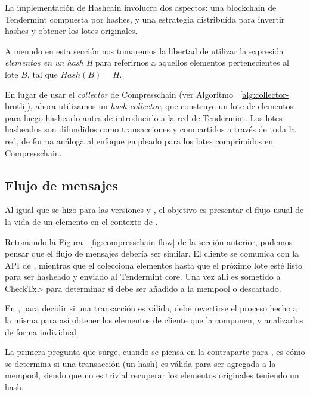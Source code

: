 La implementación de Hashcain involucra dos aspectos: una blockchain de Tendermint compuesta por hashes,
y una estrategia distribuída para invertir hashes y obtener los lotes originales.
%

A menudo en esta sección nos tomaremos la libertad de utilizar la expresión \textit{elementos en un hash H}
para referirnos a aquellos elementos pertenecientes al lote $B$, tal que $Hash(B) = H$.

En lugar de usar el \textit{collector} de Compresschain (ver Algoritmo ~\ref{alg:collector-brotli}),
ahora utilizamos un \textit{hash collector}, que construye un lote de elementos para luego hashearlo
antes de introducirlo a la red de Tendermint.
%
Los lotes hasheados son difundidos como transacciones y compartidos a través de toda la red, de forma
análoga al enfoque empleado para los lotes comprimidos en Compresschain.

\subsection{Flujo de mensajes}

Al igual que se hizo para las versiones \vanilla y \compresschain, el objetivo es presentar el flujo usual
de la vida de un elemento en el contexto de \hashchain.

%

Retomando la Figura ~\ref{fig:compresschain-flow} de la sección anterior, podemos pensar que el flujo de mensajes
debería ser similar. El cliente se comunica con la API de \setchain, mientras que el \collector colecciona elementos
hasta que el próximo lote esté listo para ser hasheado y enviado al Tendermint core.
Una vez allí es sometido a
\<CheckTx> para determinar si debe ser añadido a la mempool o descartado.

%

En \compresschain, para decidir si una transacción es válida, debe revertirse el proceso hecho a la misma para
así obtener los elementos de cliente que la componen, y analizarlos de forma individual.

%

La primera pregunta que surge, cuando se piensa en la contraparte para \hashchain, es cómo se determina si una
transacción (un hash) es válida para ser agregada a la mempool, siendo que no es trivial recuperar los
elementos originales teniendo un hash.

